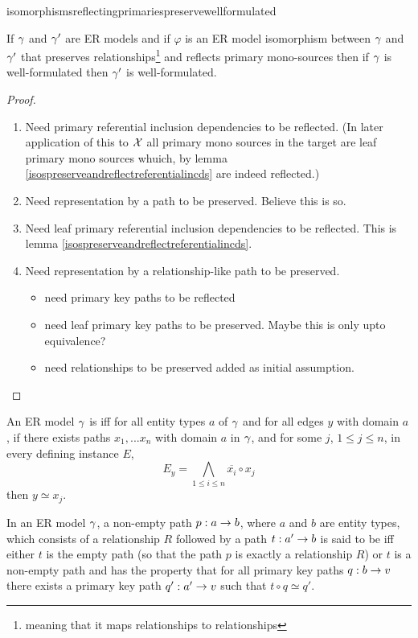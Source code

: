 isomorphismsreflectingprimariespreservewellformulated
\begin{lemma}
\label{isomorphismsreflectingprimariespreservewellformulated}
If $\gamma$ and $\gamma'$ are ER models and  if  $\varphi$ is an ER model isomorphism between $\gamma$  and $\gamma'$ that preserves relationships\footnote{meaning that it maps relationships to relationships} and reflects  primary mono-sources then if $\gamma$ is well-formulated then $\gamma'$ is well-formulated.
\end{lemma}
\begin{proof}
\begin{enumerate}
\item Need primary referential inclusion dependencies to be reflected.
      (In later application of this to $\mathcal{X}$ all primary mono sources in the target
			are leaf primary mono sources whuich, by lemma \ref{isospreserveandreflectreferentialincds} are indeed reflected.)
\item Need representation by a path to be preserved. Believe this is so.
\item Need leaf primary referential inclusion dependencies to be reflected.
      This is lemma \ref{isospreserveandreflectreferentialincds}.
\item Need representation by a relationship-like path to be preserved.
      \begin{itemize}
			\item need primary key paths to be reflected
			\item need leaf primary key paths to be preserved. Maybe this is only upto equivalence?
			\item need relationships to be preserved added as initial assumption.
			\end{itemize}
\end{enumerate}
\end{proof}
\begin{definition}
An ER model $\gamma$ is  iff for all entity types $a$ of $\gamma$ and for all edges $y$ with domain $a$, if there 
exists paths $x_1,...x_n$   with domain
$a$ in $\gamma$,  and for some $j$, $1 \leq j \leq n$, in every defining instance $E$,  
$$E_y = \bigwedge_{1 \leq i \leq n}{\overline{x_i}} \circ x_j$$
then $y \simeq x_j$.
\end{definition}

\begin{definition}
In an ER model $\gamma$, a non-empty path $p: a \rightarrow b$, where $a$ and $b$ are entity types, which consists
of a relationship $R$ followed by a  path $t :a' \rightarrow b$ is said to be  iff
either  $t$ is the empty path (so that the path $p$ is exactly a relationship $R$) or $t$
is a non-empty path and has the property that for all primary key paths $q:b \rightarrow v$ there exists 
a primary key path $q':a' \rightarrow v$ such that $t \circ q \simeq q'$.
\end{definition}


